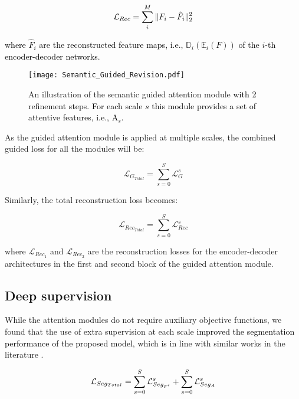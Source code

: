 \documentclass[journal]{IEEEtran}
\begin{document}
\begin{equation}
    \textcolor{black}{\mathcal{L}_{Rec} = \sum_i^{M}\|F_i-\hat F_i\|_2^2}
    \label{eq:rec_loss}
\end{equation}

\textcolor{black}{where $\hat F_i$ are the reconstructed feature maps, i.e., $\mathbb{D}_i(\mathbb{E}_i(F))$ of the $i$-th encoder-decoder networks. }

\begin{figure}[h!]
    \centering
    \texttt{[image: Semantic\_Guided\_Revision.pdf]}
    \caption{An illustration of the semantic guided attention module \textcolor{black}{with 2 refinement steps. For each scale $s$ this module provides a set of attentive features, i.e., A$_s$.}}
    \label{fig:guidedModule}
\end{figure}





As the guided attention module is applied at multiple scales, the combined guided loss for all the modules will be:

\begin{equation}
    \mathcal{L}_{G_{Total}} = \sum_{s=0}^S\mathcal{L}_{G}^s
\end{equation}

Similarly, the total reconstruction loss becomes:

\begin{equation}
    \mathcal{L}_{Rec_{Total}} = \sum_{s=0}^S\mathcal{L}_{Rec}^s
\end{equation}

where $\mathcal{L}_{Rec_1}$ and \textcolor{black}{$\mathcal{L}_{Rec_2}$} are the reconstruction losses for the encoder-decoder architectures in the first and second block of the guided attention module.



\subsection{Deep supervision}

While the attention modules do not require auxiliary objective functions, we found that the use of extra supervision at each scale \cite{lee2015deeply} \textcolor{black}{improved the segmentation performance of the proposed model}, which is in line with similar works in the literature \cite{chen2016attention,wang18d,schlemper2019attention}. 

\begin{equation}
   \mathcal{L}_{Seg_{Total}} = \sum_{s=0}^S\mathcal{L}_{Seg_{F'}}^s + \sum_{s=0}^S\mathcal{L}_{Se\textbf{\textbf{}}g_A}^s 
   \label{eq:seg_loss}
\end{equation}
\end{document}
